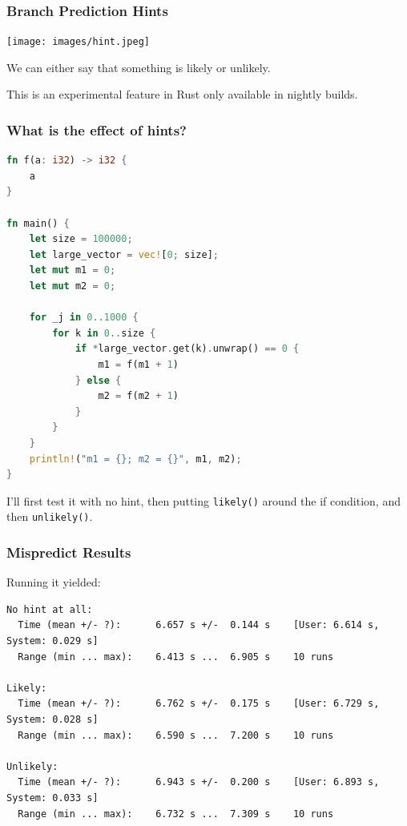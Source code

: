 \begin{frame}[fragile]
  \frametitle{Branch Prediction Hints}

\begin{center}
	\texttt{[image: images/hint.jpeg]}
\end{center}
  
We can either say that something is likely or unlikely.  

This is an experimental feature in Rust only available in nightly builds.
  
\end{frame}




\begin{frame}[fragile]
\frametitle{What is the effect of hints?}
\begin{lstlisting}[language=Rust]
fn f(a: i32) -> i32 {
    a
}

fn main() {
    let size = 100000;
    let large_vector = vec![0; size];
    let mut m1 = 0;
    let mut m2 = 0;

    for _j in 0..1000 {
        for k in 0..size {
            if *large_vector.get(k).unwrap() == 0 {
                m1 = f(m1 + 1)
            } else {
                m2 = f(m2 + 1)
            }
        }
    }
    println!("m1 = {}; m2 = {}", m1, m2);
}
\end{lstlisting}

I'll first test it with no hint, then putting \texttt{likely()} around the if condition, and then \texttt{unlikely()}.

\end{frame}



\begin{frame}[fragile]
\frametitle{Mispredict Results}

Running it yielded:
{\scriptsize
\begin{verbatim}
No hint at all:
  Time (mean +/- ?):      6.657 s +/-  0.144 s    [User: 6.614 s, System: 0.029 s]
  Range (min ... max):    6.413 s ...  6.905 s    10 runs
  
Likely:
  Time (mean +/- ?):      6.762 s +/-  0.175 s    [User: 6.729 s, System: 0.028 s]
  Range (min ... max):    6.590 s ...  7.200 s    10 runs

Unlikely:
  Time (mean +/- ?):      6.943 s +/-  0.200 s    [User: 6.893 s, System: 0.033 s]
  Range (min ... max):    6.732 s ...  7.309 s    10 runs
\end{verbatim}
}
\end{frame}



